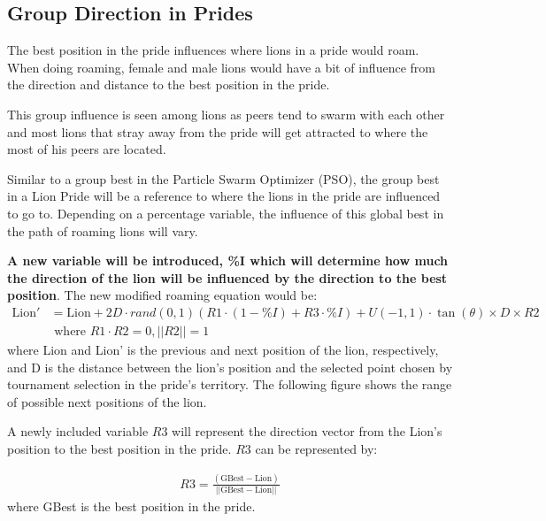 \subsection{Group Direction in Prides}
\par The best position in the pride influences where lions in a pride would roam. When doing roaming, female and male lions would have a bit of influence from the direction and distance to the best position in the pride.

\par This group influence is seen among lions as peers tend to swarm with each other and most lions that stray away from the pride will get attracted to where the most of his peers are located. \cite{strategy}

\par Similar to a group best in the Particle Swarm Optimizer (PSO), the group best in a Lion Pride will be a reference to where the lions in the pride are influenced to go to. \cite{pso} Depending on a percentage variable, the influence of this global best in the path of roaming lions will vary.

\par \textbf{A new variable will be introduced, \%I which will determine how much the direction of the lion will be influenced by the direction to the best position}. The new modified roaming equation would be:
\begin{align*}
\text{Lion}' &= \text{Lion} + 2D \cdot rand(0,1) ({R1}\cdot(1-\%I) + R3\cdot\%I) + U(-1,1) \cdot \tan(\theta) \times D \times {R2} \\
&\text{  where } R1 \cdot R2 = 0, ||R2|| = 1
\end{align*}
where Lion and Lion' is the previous and next position of the  lion, respectively, and D is the distance between the  lion's position and the selected point chosen by tournament selection in the pride's territory. The following figure shows the range of possible next positions of the lion.

\par A newly included variable $R3$ will represent the direction vector from the Lion's position to the best position in the pride. $R3$ can be represented by:

\begin{align*}
  R3 = \frac{(\text{GBest} - \text{Lion})}{||\text{GBest} - \text{Lion}||}
\end{align*}
where GBest is the best position in the pride.
